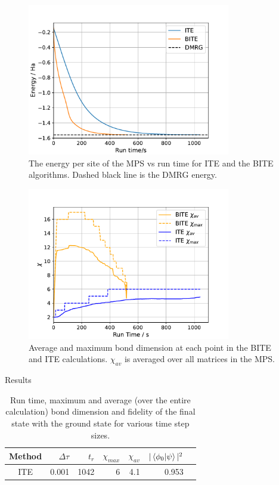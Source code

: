 \documentclass[final,hyperref={pdfpagelabels=false},mathserif]{beamer}
\begin{document}
\begin{columns}[t]
\begin{column}{40cm}
\begin{block}
\begin{figure}[H]
    \centering
    \includegraphics[width=0.79\textwidth]{Energy_tr_L100_dt0_001_g1_5_J0_5.pdf}
    \caption{The energy per site of the MPS vs run time for ITE and the BITE algorithms. Dashed black line is the DMRG energy.}
    \label{fig:energy}
\end{figure}

\begin{figure}[H]
    \centering
    \includegraphics[width=0.79\textwidth]{Chi_tr_L100_dt0_001_g1_5_J0_5.pdf}
    \caption{Average and maximum bond dimension at each point in the BITE and ITE calculations. $\chi_{av}$ is averaged over all matrices in the MPS.}
    \label{fig:chi}
\end{figure}

\end{block}

\begin{block}
{Results}

\begin{table}[h]
\caption{Run time, maximum and average (over the entire calculation) bond dimension and fidelity of the final state with the ground state for various time step sizes.}\label{tab:table-1}
\centering
    \begin{tabular}{crrrrrr}
   \toprule
    Method & $\Delta\tau$ & $t_r$ & $\chi_{max}$ & $\chi_{av}$ & $|\braket{\phi_0}{\psi}|^2$ \\
   \midrule
    ITE & 0.001 & 1042 & 6  & 4.1 & 0.953 \\


\end{tabular}
\end{table}
\end{block}
\end{column}
\end{columns}
\end{document}
